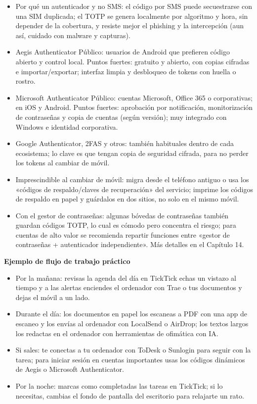 \begin{itemize}
  \item Por qué un autenticador y no SMS: el código por SMS puede secuestrarse con una SIM duplicada; el TOTP se genera localmente por algoritmo y hora, sin depender de la cobertura, y resiste mejor el phishing y la intercepción (aun así, cuidado con malware y capturas).
  \item Aegis Authenticator Público: usuarios de Android que prefieren código abierto y control local. Puntos fuertes: gratuito y abierto, con copias cifradas e importar/exportar; interfaz limpia y desbloqueo de tokens con huella o rostro.
  \item Microsoft Authenticator Público: cuentas Microsoft, Office 365 o corporativas; en iOS y Android. Puntos fuertes: aprobación por notificación, monitorización de contraseñas y copia de cuentas (según versión); muy integrado con Windows e identidad corporativa.
  \item Google Authenticator, 2FAS y otros: también habituales dentro de cada ecosistema; lo clave es que tengan copia de seguridad cifrada, para no perder los tokens al cambiar de móvil.
  \item Imprescindible al cambiar de móvil: migra desde el teléfono antiguo o usa los «códigos de respaldo/claves de recuperación» del servicio; imprime los códigos de respaldo en papel y guárdalos en dos sitios, no solo en el mismo móvil.
  \item Con el gestor de contraseñas: algunas bóvedas de contraseñas también guardan códigos TOTP, lo cual es cómodo pero concentra el riesgo; para cuentas de alto valor se recomienda repartir funciones entre «gestor de contraseñas + autenticador independiente». Más detalles en el Capítulo 14.
\end{itemize}


\textbf{Ejemplo de flujo de trabajo práctico}\par

\begin{itemize}
  \item Por la mañana: revisas la agenda del día en TickTick echas un vistazo al tiempo y a las alertas enciendes el ordenador con Trae o tus documentos y dejas el móvil a un lado.
  \item Durante el día: los documentos en papel los escaneas a PDF con una app de escaneo y los envías al ordenador con LocalSend o AirDrop; los textos largos los redactas en el ordenador con herramientas de ofimática con IA.
  \item Si sales: te conectas a tu ordenador con ToDesk o Sunlogin para seguir con la tarea; para iniciar sesión en cuentas importantes usas los códigos dinámicos de Aegis o Microsoft Authenticator.
  \item Por la noche: marcas como completadas las tareas en TickTick; si lo necesitas, cambias el fondo de pantalla del escritorio para relajarte un rato.
\end{itemize}

